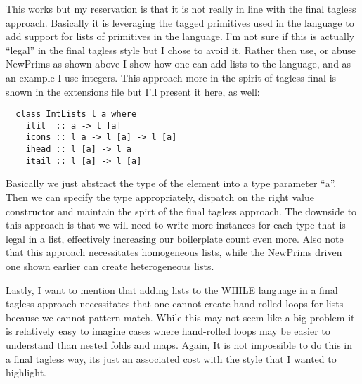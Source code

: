 \documentclass[9pt,letterpaper]{extarticle}
\begin{document}
  This works but my reservation is that it is not really in line with the
  final tagless approach. Basically it is leveraging the tagged primitives used
  in the language to add support for lists of primitives in the language. I'm
  not sure if this is actually ``legal'' in the final tagless style but I chose
  to avoid it. Rather then use, or abuse NewPrims as shown above I show how one
  can add lists to the language, and as an example I use integers. This approach
  more in the spirit of tagless final is shown in the extensions file but I'll
  present it here, as well:
  \begin{verbatim}
  class IntLists l a where
    ilit  :: a -> l [a]
    icons :: l a -> l [a] -> l [a]
    ihead :: l [a] -> l a
    itail :: l [a] -> l [a]
  \end{verbatim}

  Basically we just abstract the type of the element into a type parameter
  ``a''. Then we can specify the type appropriately, dispatch on the right value
  constructor and maintain the spirt of the final tagless approach. The downside
  to this approach is that we will need to write more instances for each type
  that is legal in a list, effectively increasing our boilerplate count even
  more. Also note that this approach necessitates homogeneous lists, while the
  NewPrims driven one shown earlier can create heterogeneous lists.

  Lastly, I want to mention that adding lists to the WHILE language in a final
  tagless approach necessitates that one cannot create hand-rolled loops for
  lists because we cannot pattern match. While this may not seem like a big
  problem it is relatively easy to imagine cases where hand-rolled loops may be
  easier to understand than nested folds and maps. Again, It is not impossible
  to do this in a final tagless way, its just an associated cost with the style
  that I wanted to highlight.
  
\end{document}
